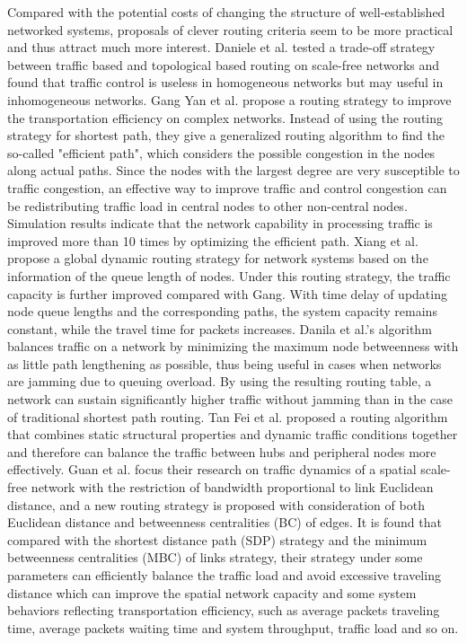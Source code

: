 \documentclass[onecolumn,preprintnumbers,amsmath,amssymb]{revtex4}
\begin{document}
Compared with the potential costs of changing the structure of well-established networked systems, proposals of clever routing criteria seem to be more practical
and thus attract much more interest.
Daniele et al. tested a trade-off strategy between traffic based and topological based routing on scale-free networks and found that traffic control is useless in homogeneous networks but may useful in inhomogeneous networks\cite{DDL}. 
Gang Yan et al. propose a routing strategy to improve the transportation efficiency on complex networks. Instead of using the routing strategy for shortest path, they give a generalized routing algorithm to find the so-called "efficient path", which considers the possible congestion in the nodes along actual paths. Since the nodes with the largest degree are very susceptible to traffic congestion, an effective way to improve traffic and control congestion can be redistributing traffic load in central nodes to other non-central nodes. Simulation results indicate that the network capability in processing traffic is improved more than 10 times by optimizing the efficient path\cite{GYT}.
Xiang et al. propose a global dynamic routing strategy for network systems based on the information of the queue length of nodes. Under this routing strategy, the traffic capacity is further improved compared with Gang\cite{GYT}. With time delay of updating node queue lengths and the corresponding paths, the system capacity remains constant, while the travel time for packets increases\cite{XLM}.
Danila et al.'s algorithm balances traffic on a network by minimizing the maximum node betweenness with as little path lengthening as possible, thus being useful in cases when networks are jamming due to queuing overload. By using the resulting routing table, a network can sustain significantly higher traffic without jamming than in the case of traditional shortest path routing\cite{BDY}.
Tan Fei et al. proposed a routing algorithm that combines static structural properties and dynamic traffic conditions together and therefore can balance the traffic between hubs and peripheral nodes more effectively\cite{FTY}.
Guan et al. focus their research on traffic dynamics of a spatial scale-free network with the restriction of bandwidth proportional to link Euclidean distance, and a new routing strategy is proposed with consideration of both Euclidean distance and betweenness centralities (BC) of edges. It is found that compared with the shortest distance path (SDP) strategy and the minimum betweenness centralities (MBC) of links strategy, their strategy under some parameters can efficiently balance the traffic load and avoid excessive traveling distance which can improve the spatial network capacity and some system behaviors reflecting transportation efficiency, such as average packets traveling time, average packets waiting time and system throughput, traffic load and so on\cite{XLMD}.
\end{document}
